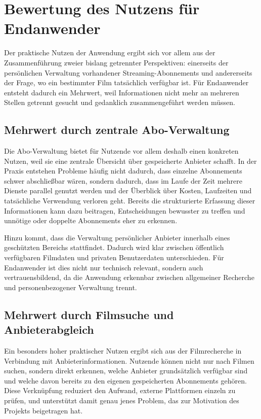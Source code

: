 \section{Bewertung des Nutzens für Endanwender}
Der praktische Nutzen der Anwendung ergibt sich vor allem aus der Zusammenführung zweier bislang getrennter Perspektiven: einerseits der persönlichen Verwaltung vorhandener Streaming-Abonnements und andererseits der Frage, wo ein bestimmter Film tatsächlich verfügbar ist. Für Endanwender entsteht dadurch ein Mehrwert, weil Informationen nicht mehr an mehreren Stellen getrennt gesucht und gedanklich zusammengeführt werden müssen.

\subsection{Mehrwert durch zentrale Abo-Verwaltung}
Die Abo-Verwaltung bietet für Nutzende vor allem deshalb einen konkreten Nutzen, weil sie eine zentrale Übersicht über gespeicherte Anbieter schafft. In der Praxis entstehen Probleme häufig nicht dadurch, dass einzelne Abonnements schwer abschließbar wären, sondern dadurch, dass im Laufe der Zeit mehrere Dienste parallel genutzt werden und der Überblick über Kosten, Laufzeiten und tatsächliche Verwendung verloren geht. Bereits die strukturierte Erfassung dieser Informationen kann dazu beitragen, Entscheidungen bewusster zu treffen und unnötige oder doppelte Abonnements eher zu erkennen.

Hinzu kommt, dass die Verwaltung persönlicher Anbieter innerhalb eines geschützten Bereichs stattfindet. Dadurch wird klar zwischen öffentlich verfügbaren Filmdaten und privaten Benutzerdaten unterschieden. Für Endanwender ist dies nicht nur technisch relevant, sondern auch vertrauensbildend, da die Anwendung erkennbar zwischen allgemeiner Recherche und personenbezogener Verwaltung trennt.

\subsection{Mehrwert durch Filmsuche und Anbieterabgleich}
Ein besonders hoher praktischer Nutzen ergibt sich aus der Filmrecherche in Verbindung mit Anbieterinformationen. Nutzende können nicht nur nach Filmen suchen, sondern direkt erkennen, welche Anbieter grundsätzlich verfügbar sind und welche davon bereits zu den eigenen gespeicherten Abonnements gehören. Diese Verknüpfung reduziert den Aufwand, externe Plattformen einzeln zu prüfen, und unterstützt damit genau jenes Problem, das zur Motivation des Projekts beigetragen hat.

